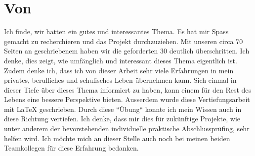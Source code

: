 \section{Von \jonas}
\authortoc{\jonas}{\sectionident}
Ich finde, wir hatten ein gutes und interessantes Thema. Es hat mir Spass gemacht zu recherchieren und das Projekt durchzuziehen. Mit unseren circa 70 Seiten an geschriebenem haben wir die geforderten 30 deutlich überschritten. Ich denke, dies zeigt, wie umfänglich und interessant dieses Thema eigentlich ist.
\newline
\newline
Zudem denke ich, dass ich von dieser Arbeit sehr viele Erfahrungen in mein privates, berufliches und schulisches Leben übernehmen kann. Sich einmal in dieser Tiefe über dieses Thema informiert zu haben, kann einem für den Rest des Lebens eine bessere Perspektive bieten. Ausserdem wurde diese Vertiefungsarbeit mit LaTeX geschrieben. Durch diese “Übung“ konnte ich mein Wissen auch in diese Richtung vertiefen. Ich denke, dass mir dies für zukünftige Projekte, wie unter anderem der bevorstehenden individuelle praktische Abschlussprüfing, sehr helfen wird.
\newline
\newline
Ich möchte mich an dieser Stelle auch noch bei meinen beiden Teamkollegen für diese Erfahrung bedanken.